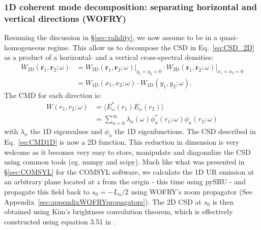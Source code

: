 \documentclass{iucr}              %
\begin{document}
\subsubsection{1D coherent mode decomposition: separating horizontal and vertical directions (WOFRY)\\}\label{sec:WOFRY1D}

Resuming the discussion in \S\ref{sec:validity}, we now assume to be in a quasi-homogeneous regime. This allow us to decompose the CSD in Eq.~\ref{eq:CSD_2D} as a product of a horizontal- and a vertical cross-spectral densities:
\begin{equation}\label{eq:CSD_2D_bis}
\begin{split}
W_\text{2D}(\textbf{r}_1,\textbf{r}_2;\omega) &= W_\text{2D}(\textbf{r}_1,\textbf{r}_2;\omega)\big\rvert_{y_1=y_2=0} \cdot W_\text{2D}(\textbf{r}_1,\textbf{r}_2;\omega)\big\rvert_{x_1=x_2=0}\\
&= W_\text{1D}(x_1,x_2;\omega)\cdot W_\text{1D}(y_1,y_2;\omega).
\end{split}
\end{equation}
The CMD for each direction is:
\begin{equation}\begin{split}
W(r_1,r_2;\omega) &= \big\langle E^*_{\omega}(r_1) E_{\omega}(r_2)\big\rangle \\&=  \sum_{n=0}^{\infty} \lambda_n(\omega) \phi_n^*(r_1;\omega) \phi_n(r_2;\omega) 
\end{split}\label{eq:CMD1D}
\end{equation}
with $\lambda_n$ the 1D eigenvalues and $\phi_n$ the 1D eigenfunctions. The CSD described in Eq.~\ref{eq:CMD1D} is now a 2D function. This reduction in dimension is very welcome as it becomes very easy to store, manipulate and diagonalize the CSD using common tools (eg. numpy and scipy). Much like what was presented in \S\ref{sec:COMSYL} for the COMSYL software,  we calculate the 1D UR emission at an arbitrary plane located at $z$ from the origin - this time using pySRU \cite{pySRU} - and propagate this field back to $s_0=-L_u\big/2$ using WOFRY's zoom propagator (See Appendix~\ref{sec:appendixWOFRYpropagators}). The 2D CSD at $s_0$ is then obtained using Kim's brightness convolution theorem, which is effectively constructed using equation 3.51 in \cite{glass2017}.
\end{document}
